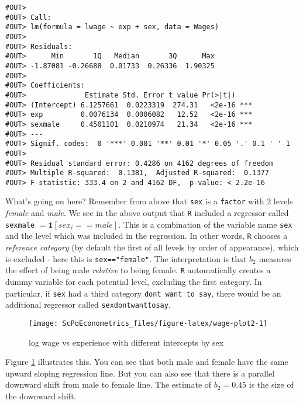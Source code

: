 \documentclass[]{book}
\begin{document}
\begin{verbatim}
#OUT> 
#OUT> Call:
#OUT> lm(formula = lwage ~ exp + sex, data = Wages)
#OUT> 
#OUT> Residuals:
#OUT>      Min       1Q   Median       3Q      Max 
#OUT> -1.87081 -0.26688  0.01733  0.26336  1.90325 
#OUT> 
#OUT> Coefficients:
#OUT>              Estimate Std. Error t value Pr(>|t|)    
#OUT> (Intercept) 6.1257661  0.0223319  274.31   <2e-16 ***
#OUT> exp         0.0076134  0.0006082   12.52   <2e-16 ***
#OUT> sexmale     0.4501101  0.0210974   21.34   <2e-16 ***
#OUT> ---
#OUT> Signif. codes:  0 '***' 0.001 '**' 0.01 '*' 0.05 '.' 0.1 ' ' 1
#OUT> 
#OUT> Residual standard error: 0.4286 on 4162 degrees of freedom
#OUT> Multiple R-squared:  0.1381,  Adjusted R-squared:  0.1377 
#OUT> F-statistic: 333.4 on 2 and 4162 DF,  p-value: < 2.2e-16
\end{verbatim}

What's going on here? Remember from above that \texttt{sex} is a
\texttt{factor} with 2 levels \emph{female} and \emph{male}. We see in
the above output that \texttt{R} included a regressor called
\texttt{sexmale} \(=\mathbf{1}[sex_i==male]\). This is a combination of
the variable name \texttt{sex} and the level which was included in the
regression. In other words, \texttt{R} chooses a \emph{reference
category} (by default the first of all levels by order of appearance),
which is excluded - here this is \texttt{sex=="female"}. The
interpretation is that \(b_2\) measures the effect of being male
\emph{relative} to being female. \texttt{R} automatically creates a
dummy variable for each potential level, excluding the first category.
In particular, if \texttt{sex} had a third category
\texttt{dont\ want\ to\ say}, there would be an additional regressor
called \texttt{sexdontwanttosay}.

\begin{figure}

{\centering \texttt{[image: ScPoEconometrics\_files/figure-latex/wage-plot2-1]} 

}

\caption{log wage vs experience with different intercepts by sex}\label{fig:wage-plot2}
\end{figure}

Figure \ref{fig:wage-plot2} illustrates this. You can see that both male
and female have the same upward sloping regression line. But you can
also see that there is a parallel downward shift from male to female
line. The estimate of \(b_2 = 0.45\) is the size of the downward shift.
\end{document}
